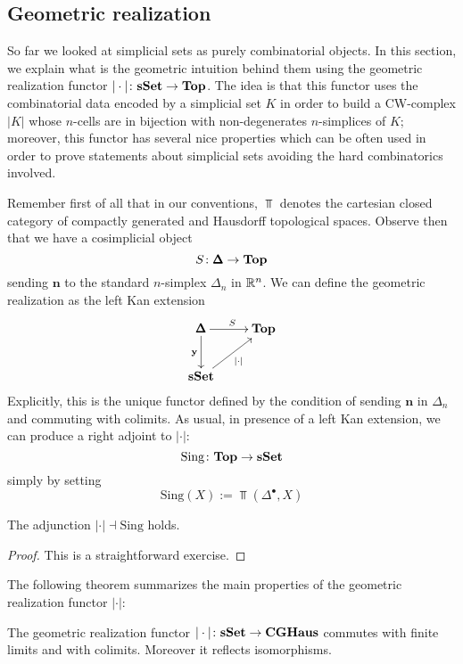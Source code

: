 \begin{refsection}
\section{Geometric realization} \label{geometric realization}

So far we looked at simplicial sets as purely combinatorial objects. In this section, we explain what is the geometric intuition behind them using the geometric realization functor $|\cdot| \colon \mathbf{s\,\!\mathbf{Set}} \to \mathbf{Top}$. The idea is that this functor uses the combinatorial data encoded by a simplicial set $K$ in order to build a CW-complex $|K|$ whose $n$-cells are in bijection with non-degenerates $n$-simplices of $K$; moreover, this functor has several nice properties which can be often used in order to prove statements about simplicial sets avoiding the hard combinatorics involved.

Remember first of all that in our conventions, $\Top$ denotes the cartesian closed category of compactly generated and Hausdorff topological spaces. Observe then that we have a cosimplicial object
\[
S \colon \pmb{\Delta} \to \mathbf{Top}
\]
sending $\mathbf n$ to the standard $n$-simplex $\Delta_n$ in $\mathbb{R}^n$. We can define the geometric realization as the left Kan extension
\[
\xymatrix{
\SDelta \ar[r]^{S} \ar[d]_{\mathbf y} & \Top \\
\sSet \ar[ur]_{|\cdot|}
}
\]
Explicitly, this is the unique functor defined by the condition of sending $\mathbf n$ in $\Delta_n$ and commuting with colimits. As usual, in presence of a left Kan extension, we can produce a right adjoint to $|\cdot|$:
\[
\mathrm{Sing} \colon \mathbf{Top} \to \mathbf{s\,\!\mathbf{Set}}
\]
simply by setting
\[
\mathrm{Sing}(X) := \Top(\Delta^{\bullet}, X)
\]

\begin{lemma}
The adjunction $|\cdot| \dashv \mathrm{Sing}$ holds.
\end{lemma}

\begin{proof}
This is a straightforward exercise.
\end{proof}

The following theorem summarizes the main properties of the geometric realization functor $|\cdot|$:

\begin{thm} \label{thm exactness of geometric realization}
The geometric realization functor $| \cdot | \colon \mathbf{s\,\!\mathbf{Set}} \to \mathbf{CGHaus}$ commutes with finite limits and with colimits. Moreover it reflects isomorphisms.
\end{thm}


\end{refsection}
